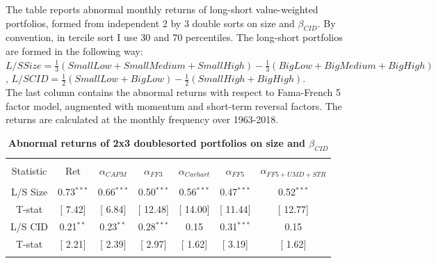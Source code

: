 \documentclass[12pt]{article}
\begin{document}
\begin{table}[!htbp] \centering 
  \caption{\textbf{Abnormal returns of 2x3 doublesorted portfolios on size and $\beta_{CID}$}}
  \label{} 
  \begin{flushleft}
    {\medskip\small
 The table reports abnormal monthly returns of long-short value-weighted portfolios, formed from independent 2 by 3 double sorts on size and $\beta_{CID}$. By convention, in tercile sort I use 30 and 70 percentiles. The long-short portfolios are formed in the following way:
 $L/S Size = \frac{1}{3}(SmallLow+SmallMedium+SmallHigh) - \frac{1}{3}(BigLow+BigMedium+BigHigh)$,
 $L/S CID = \frac{1}{2}(SmallLow+BigLow) - \frac{1}{2}(SmallHigh+BigHigh)$. \\
 The last column contains the abnormal returns with respect to Fama-French 5 factor model, augmented with momentum and short-term reversal factors. The returns are calculated at the monthly frequency over 1963-2018.}
    \medskip
    \end{flushleft}
\begin{tabular}{@{\extracolsep{5pt}} ccccccc} 
\\[-1.8ex]\hline 
\hline \\[-1.8ex] 
Statistic & Ret & $\alpha_{CAPM}$ & $\alpha_{FF3}$ & $\alpha_{Carhart}$ & $\alpha_{FF5}$ & $\alpha_{FF5+UMD+STR}$ \\ 
\hline \\[-1.8ex] 
L/S Size & 0.73$^{***}$ & 0.66$^{***}$ & 0.50$^{***}$ & 0.56$^{***}$ & 0.47$^{***}$ & 0.52$^{***}$ \\ 
T-stat & [ 7.42] & [ 6.84] & [ 12.48] & [ 14.00] & [ 11.44] & [ 12.77] \\ 
L/S CID & 0.21$^{**}$ & 0.23$^{**}$ & 0.28$^{***}$ & 0.15 & 0.31$^{***}$ & 0.15 \\ 
T-stat & [ 2.21] & [ 2.39] & [ 2.97] & [ 1.62] & [ 3.19] & [ 1.62] \\ 
\hline \\[-1.8ex] 
\end{tabular} 
\end{table}
\end{document}

